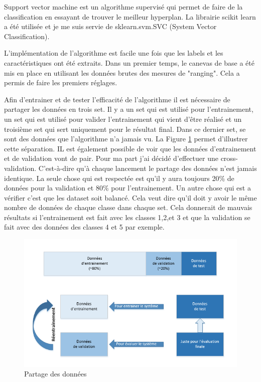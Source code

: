 Support vector machine est un algorithme supervisé qui permet de faire de la classification en essayant de trouver le meilleur hyperplan. La librairie scikit learn a été utilisée et je me suis servie de sklearn.svm.SVC (System Vector Classification).

L’implémentation de l’algorithme est facile une fois que les labels et les caractéristiques ont été extraits. Dans un premier temps, le canevas de base a été mis en place en utilisant les données brutes des mesures de "ranging". Cela a permis de faire les premiers réglages. 

Afin d'entrainer et de tester l'efficacité de l'algorithme il est nécessaire de partager les données en trois set. Il y a un set qui est utilisé pour l'entrainement, un set qui est utilisé pour valider l'entrainement qui vient d'être réalisé et un troisième set qui sert uniquement pour le résultat final. Dans ce dernier set, se sont des données que l'algorithme n'a jamais vu. La Figure \ref{fig:datasep} permet d'illustrer cette séparation. IL est également possible de voir que les données d'entrainement et de validation vont de pair. Pour ma part j'ai décidé d'effectuer une cross-validation. C'est-à-dire qu'à chaque lancement le partage des données n'est jamais identique. La seule chose qui est respectée est qu'il y aura toujours 20\% de données pour la validation et 80\% pour l'entrainement. Un autre chose qui est a vérifier c'est que les dataset soit balancé. Cela veut dire qu'il doit y avoir le même nombre de données de chaque classe dans chaque set. Cela donnerait de mauvais résultats si l'entrainement est fait avec les classes 1,2,et 3 et que la validation se fait avec des données des classes 4 et 5 par exemple. 

\begin{figure}[htp]
	\begin{center}
		\includegraphics[scale=0.7]{figures/data_separation.png}
		\caption{Partage des données}
		\label{fig:datasep} %
	\end{center}
\end{figure}

